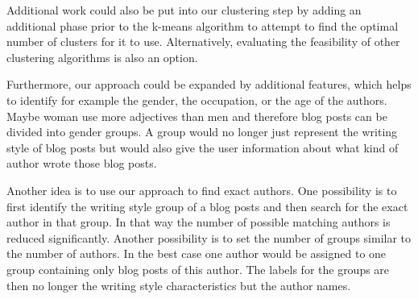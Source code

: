 Additional work could also be put into our clustering step by adding an additional phase prior to the k-means algorithm to attempt to find the optimal number of clusters for it to use.
Alternatively, evaluating the feasibility of other clustering algorithms is also an option.


Furthermore, our approach could be expanded by additional features, which helps to identify for example the gender, the occupation, or the age of the authors.
Maybe woman use more adjectives than men and therefore blog posts can be divided into gender groups.
A group would no longer just represent the writing style of blog posts but would also give the user information about what kind of author wrote those blog posts.


Another idea is to use our approach to find exact authors.
One possibility is to first identify the writing style group of a blog posts and then search for the exact author in that group.
In that way the number of possible matching authors is reduced significantly.
Another possibility is to set the number of groups similar to the number of authors.
In the best case one author would be assigned to one group containing only blog posts of this author.
The labels for the groups are then no longer the writing style characteristics but the author names.
